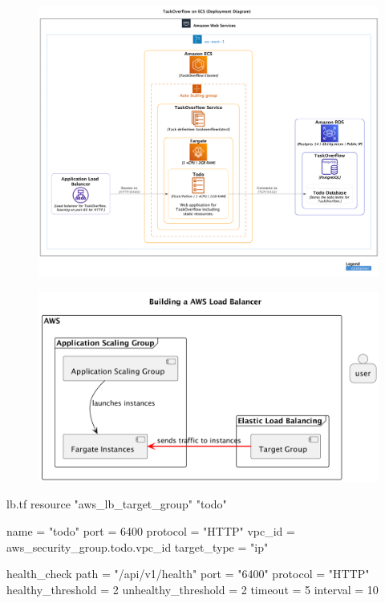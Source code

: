 \documentclass{csse4400}
\begin{document}
\begin{figure}[H]
  \includegraphics[width=\textwidth]{diagrams/ecsdeployment}
\end{figure}


\begin{figure}[H]
  \includegraphics[width=\textwidth]{diagrams/lb2fargate.png}
\end{figure}

\begin{code}[language=terraform,numbers=none]{lb.tf}
resource "aws_lb_target_group" "todo" {
  name     = "todo"
  port     = 6400
  protocol = "HTTP"
  vpc_id   = aws_security_group.todo.vpc_id
  target_type = "ip"

  health_check {
    path = "/api/v1/health"
    port = "6400"
    protocol = "HTTP"
    healthy_threshold = 2
    unhealthy_threshold = 2
    timeout = 5
    interval = 10
  }
}
\end{code}
\end{document}
